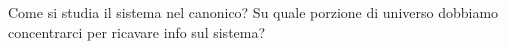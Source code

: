 \question  Come si studia il sistema nel canonico? Su quale porzione di universo dobbiamo concentrarci per ricavare info sul sistema?
